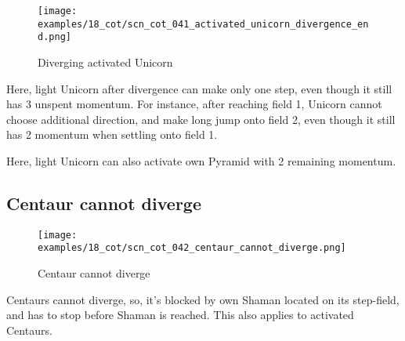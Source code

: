 \clearpage %

\vspace*{-2.1\baselineskip}
\noindent
\begin{figure}[!h]
\texttt{[image: examples/18\_cot/scn\_cot\_041\_activated\_unicorn\_divergence\_end.png]}
\vspace*{-1.3\baselineskip}
\caption{Diverging activated Unicorn}
\label{fig:scn_cot_041_activated_unicorn_divergence_end}
\end{figure}

\vspace*{-0.4\baselineskip}
Here, light Unicorn after divergence can make only one step, even though it still
has 3 unspent momentum. For instance, after reaching field 1, Unicorn cannot choose
additional direction, and make long jump onto field 2, even though it still has 2
momentum when settling onto field 1.

Here, light Unicorn can also activate own Pyramid with 2 remaining momentum.

\clearpage %

\subsection*{Centaur cannot diverge}
\label{sec:Conquest of Tlalocan/Divergence/Centaur cannot diverge}

\vspace*{-1.4\baselineskip}
\noindent
\begin{figure}[!h]
\texttt{[image: examples/18\_cot/scn\_cot\_042\_centaur\_cannot\_diverge.png]}
\vspace*{-1.3\baselineskip}
\caption{Centaur cannot diverge}
\label{fig:scn_cot_042_centaur_cannot_diverge}
\end{figure}

\vspace*{-0.5\baselineskip}
Centaurs cannot diverge, so, it's blocked by own Shaman located on its step-field,
and has to stop before Shaman is reached. This also applies to activated Centaurs.

\clearpage %

